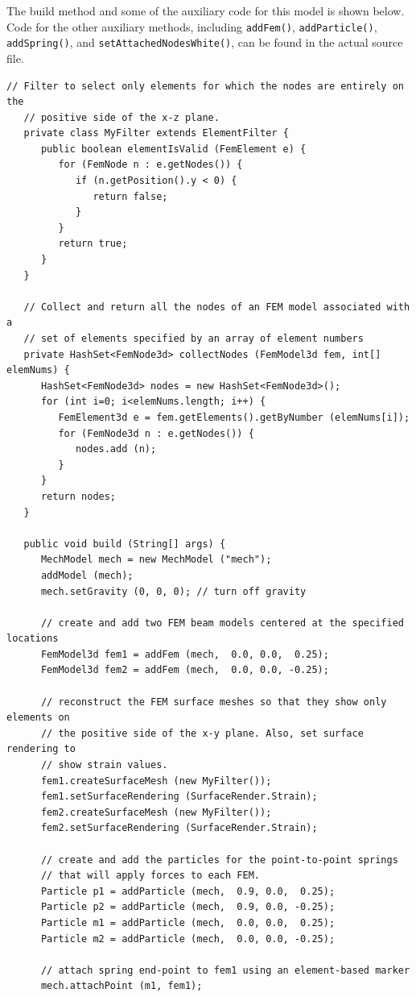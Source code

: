 The build method and some of the auxiliary code for this model is shown below.
Code for the other auxiliary methods, including {\tt addFem()},
{\tt addParticle()}, {\tt addSpring()}, and {\tt setAttachedNodesWhite()},
can be found in the actual source file.
\lstset{numbers=left}
\begin{lstlisting}[]
   // Filter to select only elements for which the nodes are entirely on the
   // positive side of the x-z plane.
   private class MyFilter extends ElementFilter {
      public boolean elementIsValid (FemElement e) {
         for (FemNode n : e.getNodes()) {
            if (n.getPosition().y < 0) {
               return false;
            }
         }
         return true;         
      }
   }

   // Collect and return all the nodes of an FEM model associated with a
   // set of elements specified by an array of element numbers
   private HashSet<FemNode3d> collectNodes (FemModel3d fem, int[] elemNums) {
      HashSet<FemNode3d> nodes = new HashSet<FemNode3d>();
      for (int i=0; i<elemNums.length; i++) {
         FemElement3d e = fem.getElements().getByNumber (elemNums[i]);
         for (FemNode3d n : e.getNodes()) {
            nodes.add (n);
         }
      }
      return nodes;
   }

   public void build (String[] args) {
      MechModel mech = new MechModel ("mech");
      addModel (mech);
      mech.setGravity (0, 0, 0); // turn off gravity

      // create and add two FEM beam models centered at the specified locations
      FemModel3d fem1 = addFem (mech,  0.0, 0.0,  0.25);
      FemModel3d fem2 = addFem (mech,  0.0, 0.0, -0.25);

      // reconstruct the FEM surface meshes so that they show only elements on
      // the positive side of the x-y plane. Also, set surface rendering to
      // show strain values.
      fem1.createSurfaceMesh (new MyFilter());
      fem1.setSurfaceRendering (SurfaceRender.Strain);
      fem2.createSurfaceMesh (new MyFilter());
      fem2.setSurfaceRendering (SurfaceRender.Strain);

      // create and add the particles for the point-to-point springs
      // that will apply forces to each FEM.
      Particle p1 = addParticle (mech,  0.9, 0.0,  0.25);
      Particle p2 = addParticle (mech,  0.9, 0.0, -0.25);
      Particle m1 = addParticle (mech,  0.0, 0.0,  0.25);
      Particle m2 = addParticle (mech,  0.0, 0.0, -0.25);

      // attach spring end-point to fem1 using an element-based marker
      mech.attachPoint (m1, fem1);


\end{lstlisting}
